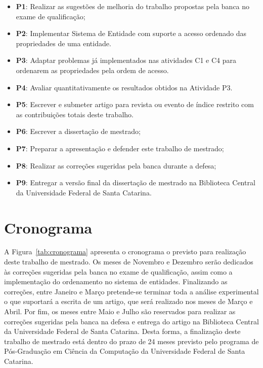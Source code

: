 \begin{itemize}
    \item \textbf{P1}: Realizar as sugestões de melhoria do trabalho propostas pela banca no exame de qualificação;
    \item \textbf{P2}: Implementar Sistema de Entidade com suporte a acesso ordenado das propriedades de uma entidade.
    \item \textbf{P3}: Adaptar problemas já implementados nas atividades C1 e C4 para ordenarem as propriedades pela ordem de acesso.
    \item \textbf{P4}: Avaliar quantitativamente os resultados obtidos na Atividade P3.
    \item \textbf{P5}: Escrever e submeter artigo para revista ou evento de índice restrito com as contribuições totais deste trabalho.
    \item \textbf{P6}: Escrever a dissertação de mestrado;
    \item \textbf{P7}: Preparar a apresentação e defender este trabalho de mestrado;
    \item \textbf{P8}: Realizar as correções sugeridas pela banca durante a defesa;
    \item \textbf{P9}: Entregar a versão final da dissertação de mestrado na Biblioteca Central da Universidade Federal de Santa Catarina.
\end{itemize}

\section{Cronograma}

A Figura~\ref{tab:cronograma} apresenta o cronograma o previsto para realização deste trabalho de mestrado.
Os meses de Novembro e Dezembro serão dedicados às correções sugeridas pela banca no exame de qualificação, assim como a implementação do ordenamento no sistema de entidades.
Finalizando as correções, entre Janeiro e Março pretende-se terminar toda a análise experimental o que suportará a escrita de um artigo, que será realizado nos meses de Março e Abril.
Por fim, os meses entre Maio e Julho são reservados para realizar as correções sugeridas pela banca na defesa e entrega do artigo na Biblioteca Central da Universidade Federal de Santa Catarina.
Desta forma, a finalização deste trabalho de mestrado está dentro do prazo de 24 meses previsto pelo programa de Pós-Graduação em Ciência da Computação da Universidade Federal de Santa Catarina.


